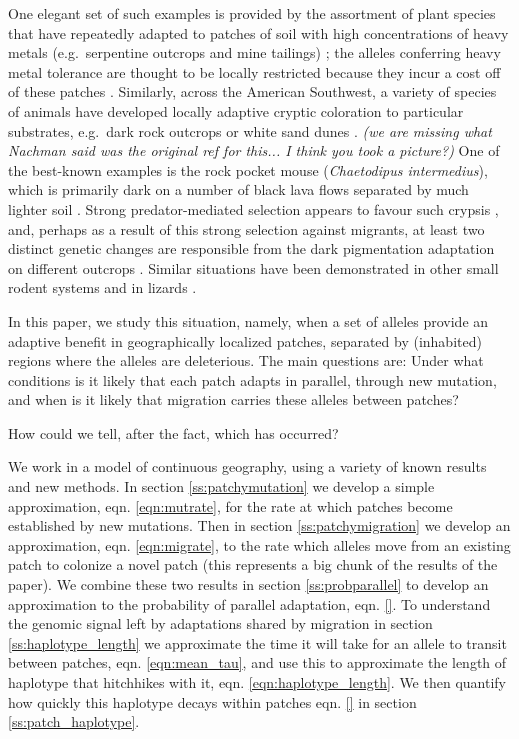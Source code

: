 \documentclass{article}
\newcommand{\plr}[1]{{\it\color{blue}(#1)}}
\begin{document}
One elegant set of such examples is provided by the assortment of plant species 
that have repeatedly adapted to patches of soil with high concentrations of heavy metals
(e.g.\ serpentine outcrops and mine tailings) \citep{macnair1991evolution,schat1996identical,turner2010serpentine};
the alleles conferring heavy metal tolerance are thought to be locally restricted 
because they incur a cost off of these patches \citep{wright2013indirect}.
Similarly, across the American Southwest, a variety of species of animals have developed locally adaptive cryptic coloration
to particular substrates, e.g.\ dark rock outcrops or white sand dunes \citep{benson1933concealing}.
\plr{we are missing what Nachman said was the original ref for this... I think you took a picture?}
One of the best-known examples is the rock pocket mouse (\textit{Chaetodipus intermedius}),
which is primarily dark on a number of black lava flows separated by much lighter soil \citep{dice1940ecologic}.
Strong predator-mediated selection appears to favour such crypsis \citep{kaufman1974adaptive},
and, perhaps as a result of this strong selection against migrants, 
at least two distinct genetic changes are responsible from the dark pigmentation adaptation on different outcrops \citep{hoekstra2003different}. 
Similar situations have been demonstrated in other small rodent systems \citep{steiner2009genetic,kingsley2009melanism}
and in lizards \citep{rosenblum2010molecular}.

In this paper, we study this situation, namely,
when a set of alleles provide an adaptive benefit in geographically localized patches, 
separated by (inhabited) regions where the alleles are deleterious.
The main questions are:
Under what conditions is it likely that each patch adapts in parallel, through new mutation,
and when is it likely that migration carries these alleles between patches?

How could we tell, after the fact, which has occurred?


We work in a model of continuous geography,
using a variety of known results and new methods.
In section \ref{ss:patchymutation} we develop a simple approximation,
eqn. \eqref{eqn:mutrate}, for the rate at which patches become
established by new mutations. Then in section \ref{ss:patchymigration} we
develop an approximation, eqn. \eqref{eqn:migrate}, to the rate which alleles move from an
existing patch to colonize a novel patch (this represents a big chunk
of the results of the paper). We combine these two results in section
\ref{ss:probparallel} to develop an approximation to the probability of
parallel adaptation, eqn. \eqref{}.
To understand the genomic signal left by adaptations shared by
migration in section \ref{ss:haplotype_length} we approximate the time
it will take for an allele to transit between patches,
eqn. \eqref{eqn:mean_tau}, and use this to approximate the length of
haplotype that hitchhikes with it,
eqn. \eqref{eqn:haplotype_length}. We then quantify how quickly this
haplotype decays within patches eqn. \eqref{} in section \ref{ss:patch_haplotype}. 
\end{document}
